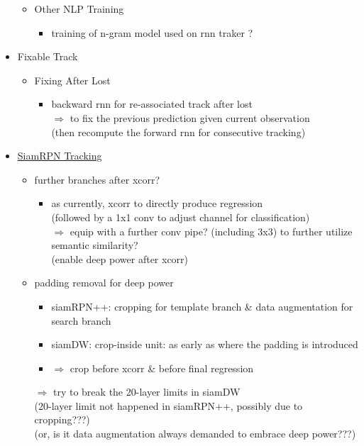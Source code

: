 \begin{itemize}
\begin{itemize}
	\item Other NLP Training
		\begin{itemize}
		\item training of n-gram model used on rnn traker ?
		\end{itemize}
	\end{itemize}
\item Fixable Track
	\begin{itemize}
	\item Fixing After Lost
		\begin{itemize}
		\item backward rnn for re-associated track after lost \\
		$\Rightarrow$ to fix the previous prediction given current observation \\
		(then recompute the forward rnn for consecutive tracking)
		\end{itemize}
	\end{itemize}
\item \underline{SiamRPN Tracking}
	\begin{itemize}
	\item further branches after xcorr?
		\begin{itemize}
		\item as currently, xcorr to directly produce regression \\ 
		(followed by a 1x1 conv to adjust channel for classification) \\
		$\Rightarrow$ equip with a further conv pipe? (including 3x3) to further utilize semantic similarity? \\
		(enable deep power after xcorr)
		\end{itemize}
	\item padding removal for deep power
		\begin{itemize}
		\item siamRPN++: cropping for template branch \& data augmentation for search branch
		\item siamDW: crop-inside unit: as early as where the padding is introduced
		\item $\Rightarrow$ crop before xcorr \& before final regression
		\end{itemize}
	$\Rightarrow$ try to break the 20-layer limits in siamDW \\
	(20-layer limit not happened in siamRPN++, possibly due to cropping???) \\
	(or, is it data augmentation always demanded to embrace deep power???) \\

\end{itemize}
\end{itemize}
